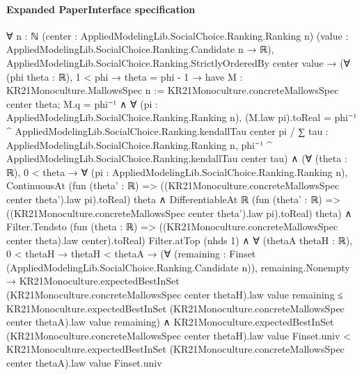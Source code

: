 \documentclass[10pt]{article}
\begin{document}
\paragraph{Expanded PaperInterface specification}
\begin{ReviewVerbatim}
∀ {n : ℕ} (center : AppliedModelingLib.SocialChoice.Ranking.Ranking n)
  (value : AppliedModelingLib.SocialChoice.Ranking.Candidate n → ℝ),
  AppliedModelingLib.SocialChoice.Ranking.StrictlyOrderedBy center value →
    (∀ (phi theta : ℝ),
        1 < phi →
          theta = phi - 1 →
            have M : KR21Monoculture.MallowsSpec n := KR21Monoculture.concreteMallowsSpec center theta;
            M.q = phi⁻¹ ∧
              ∀ (pi : AppliedModelingLib.SocialChoice.Ranking.Ranking n),
                (M.law pi).toReal =
                  phi⁻¹ ^ AppliedModelingLib.SocialChoice.Ranking.kendallTau center pi /
                    ∑ tau : AppliedModelingLib.SocialChoice.Ranking.Ranking n,
                      phi⁻¹ ^ AppliedModelingLib.SocialChoice.Ranking.kendallTau center tau) ∧
      (∀ (theta : ℝ),
          0 < theta →
            ∀ (pi : AppliedModelingLib.SocialChoice.Ranking.Ranking n),
              ContinuousAt (fun (theta' : ℝ) => ((KR21Monoculture.concreteMallowsSpec center theta').law pi).toReal)
                  theta ∧
                DifferentiableAt ℝ
                  (fun (theta' : ℝ) => ((KR21Monoculture.concreteMallowsSpec center theta').law pi).toReal) theta) ∧
        Filter.Tendsto (fun (theta : ℝ) => ((KR21Monoculture.concreteMallowsSpec center theta).law center).toReal)
            Filter.atTop (nhds 1) ∧
          ∀ (thetaA thetaH : ℝ),
            0 < thetaH →
              thetaH < thetaA →
                (∀ (remaining : Finset (AppliedModelingLib.SocialChoice.Ranking.Candidate n)),
                    remaining.Nonempty →
                      KR21Monoculture.expectedBestInSet (KR21Monoculture.concreteMallowsSpec center thetaH).law value
                          remaining ≤
                        KR21Monoculture.expectedBestInSet (KR21Monoculture.concreteMallowsSpec center thetaA).law value
                          remaining) ∧
                  KR21Monoculture.expectedBestInSet (KR21Monoculture.concreteMallowsSpec center thetaH).law value
                      Finset.univ <
                    KR21Monoculture.expectedBestInSet (KR21Monoculture.concreteMallowsSpec center thetaA).law value
                      Finset.univ
\end{ReviewVerbatim}
\end{document}
